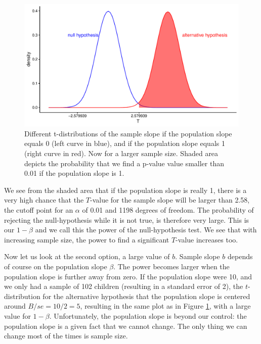 \documentclass[]{book}\usepackage[]{graphicx}\usepackage[]{color}
\makeatletter
\def\maxwidth{ %
  \ifdim\Gin@nat@width>\linewidth
    \linewidth
  \else
    \Gin@nat@width
  \fi
}
\newenvironment{knitrout}{}{} %
\makeatother
\begin{document}
\begin{knitrout}
\color{fgcolor}\begin{figure}

{\centering \includegraphics[width=\maxwidth]{figure/inf_24-1} 

}

\caption[Different t-distributions of the sample slope if the population slope equals 0 (left curve in blue), and if the population slope equals 1 (right curve in red)]{Different t-distributions of the sample slope if the population slope equals 0 (left curve in blue), and if the population slope equals 1 (right curve in red). Now for a larger sample size. Shaded area depicts the probability that we find a p-value value smaller than 0.01 if the population slope is 1.}\label{fig:inf_24}
\end{figure}


\end{knitrout}


We see from the shaded area that if the population slope is really 1, there is a very high chance that the $T$-value for the sample slope will be larger than 2.58, the cutoff point for an $\alpha$ of 0.01 and 1198 degrees of freedom. The probability of rejecting the null-hypothesis while it is not true, is therefore very large. This is our $1-\beta$ and we call this the power of the null-hypothesis test. We see that with increasing sample size, the power to find a significant $T$-value increases too.

Now let us look at the second option, a large value of $b$. Sample slope $b$ depends of course on the population slope $\beta$. The power becomes larger when the population slope is further away from zero. If the population slope were 10, and we only had a sample of 102 children (resulting in a standard error of 2), the $t$-distribution for the alternative hypothesis that the population slope is centered around $B/se=10/2=5$, resulting in the same plot as in Figure \ref{fig:inf_24}, with a large value for $1-\beta$. Unfortunately, the population slope is beyond our control: the population slope is a given fact that we cannot change. The only thing we can change most of the times is sample size. 
\end{document}
